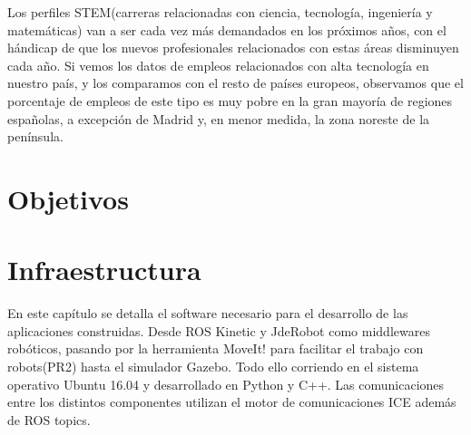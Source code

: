 \documentclass[12pt,spanish,chapterprefix, numbers=noenddot]{book}
\numberwithin{equation}{section}
\numberwithin{figure}{section}
\begin{document}
Los perfiles STEM(carreras relacionadas con ciencia, tecnología, ingeniería y matemáticas) van a ser cada vez más demandados en los próximos años, con el hándicap de que los nuevos profesionales relacionados con estas áreas disminuyen cada año. 
Si vemos los datos de empleos relacionados con alta tecnología en nuestro país, y los comparamos con el resto de países europeos, observamos que el porcentaje de empleos de este tipo es muy pobre en la gran mayoría de regiones españolas, a excepción de Madrid y, en menor medida, la zona noreste de la península. 


\section{}
\subsection{}
\subsection{}

\chapter{Objetivos}
\section{}

\chapter{Infraestructura}
En este capítulo se detalla el software necesario para el desarrollo de las aplicaciones construidas. Desde ROS Kinetic y JdeRobot como middlewares robóticos, pasando por la herramienta MoveIt! para facilitar el trabajo con robots(PR2) hasta el simulador Gazebo. Todo ello corriendo en el sistema operativo Ubuntu 16.04 y desarrollado en Python y C++.  Las comunicaciones entre los distintos componentes utilizan el motor de comunicaciones ICE además de ROS topics. 
\end{document}
